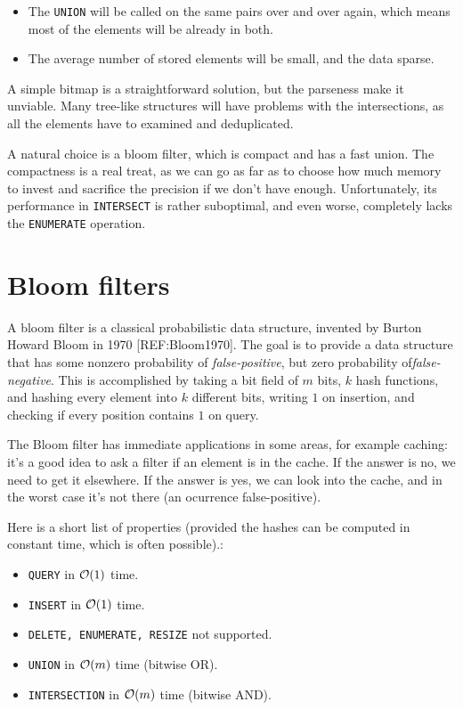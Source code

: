\begin{itemize}
	\item The {\tt UNION} will be called on the same pairs over and over again,
		which means most of the elements will be already in both.
	\item The average number of stored elements will be small, and the data sparse.
\end{itemize}

A simple bitmap is a straightforward solution, but the parseness make it
unviable. Many tree-like structures will have problems with the intersections,
as all the elements have to examined and deduplicated.

A natural choice is a bloom filter, which is compact and has a fast union. The
compactness is a real treat, as we can go as far as to choose how much memory to
invest and sacrifice the precision if we don't have enough. Unfortunately, its
performance in {\tt INTERSECT} is rather suboptimal, and even worse, completely
lacks the {\tt ENUMERATE} operation.


\section{Bloom filters}

A bloom filter is a classical probabilistic data structure, invented by Burton
Howard Bloom in 1970 [REF:Bloom1970]. The goal is to provide a data structure
that has some nonzero probability of {\it false-positive}, but zero probability
of{\it false-negative}. This is accomplished by taking a bit field of $m$ bits,
$k$ hash functions, and hashing every element into $k$ different bits, writing
$1$ on insertion, and checking if every position contains $1$ on query.

The Bloom filter has immediate applications in some areas, for example caching:
it's a good idea to ask a filter if an element is in the cache. If the answer is
no, we need to get it elsewhere. If the answer is yes, we can look into the
cache, and in the worst case it's not there (an ocurrence false-positive).

Here is a short list of properties (provided the hashes can be computed in
constant time, which is often possible).:

\begin{itemize}
	\item {\tt QUERY} in $\mathcal{O}(1)$ time.
	\item {\tt INSERT} in $\mathcal{O}(1)$ time.
	\item {\tt DELETE, ENUMERATE, RESIZE} not supported.
	\item {\tt UNION} in $\mathcal{O}(m)$ time (bitwise OR).
	\item {\tt INTERSECTION} in $\mathcal{O}(m)$ time (bitwise AND).
\end{itemize}


